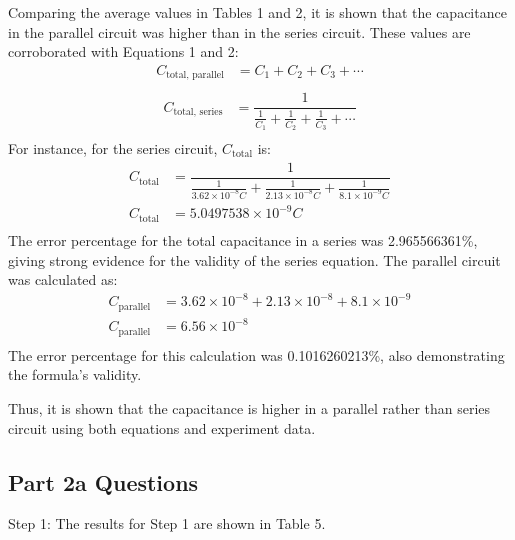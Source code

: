 \documentclass [12pt, letterpaper, twoside] {article}
\begin{document}
Comparing the average values in Tables 1 and 2, it is shown that the capacitance in the parallel circuit was higher than in the series circuit. These values are corroborated with Equations 1 and 2:
\begin{equation}
  \begin{split}
    C_{\text{total, parallel}} &= C_{1} + C_{2} + C_{3} + \cdots \\
  \end{split}
\end{equation}
\begin{equation}
  \begin{split}
    C_{\text{total, series}} &= \dfrac{1}{\tfrac{1}{C_{1}} + \tfrac{1}{C_{2}} + \tfrac{1}{C_{3}} + \cdots} \\
  \end{split}
\end{equation}
 For instance, for the series circuit, \(C_{\text{total}}\) is:
\begin{equation*}
  \begin{split}
    C_{\text{total}} &= \dfrac{1}{\tfrac{1}{3.62\times10^{-8}C} + \tfrac{1}{2.13\times10^{-8}C} + \tfrac{1}{8.1\times10^{-9}C}} \\
    C_{\text{total}} &= 5.0497538\times10^{-9}C \\
  \end{split}
\end{equation*}
The error percentage for the total capacitance in a series was 2.965566361\%, giving strong evidence for the validity of the series equation. The parallel circuit was calculated as:
\begin{equation*}
  \begin{split}
    C_{\text{parallel}} &= 3.62\times10^{-8} + 2.13\times10^{-8} + 8.1\times10^{-9} \\
    C_{\text{parallel}} &= 6.56\times10^{-8} \\
  \end{split}
\end{equation*}
The error percentage for this calculation was 0.1016260213\%, also demonstrating the formula's validity.

\noindent
Thus, it is shown that the capacitance is higher in a parallel rather than series circuit using both equations and experiment data.

\subsection* {Part 2a Questions}
Step 1: The results for Step 1 are shown in Table 5.
\end{document}
